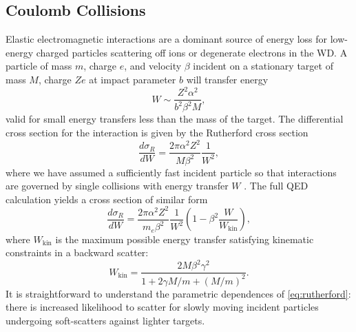 \documentclass[twocolumn,showpacs,preprintnumbers,amsmath,amssymb,prd]{revtex4}
\def\r{\right)}
\def\l{\left(}
\begin{document}
\begin{appendices}
\subsection*{Coulomb Collisions}

Elastic electromagnetic interactions are a dominant source of energy loss for low-energy charged particles scattering off ions or degenerate electrons in the WD. 
A particle of mass $m$, charge $e$, and velocity $\beta$ incident on a stationary target of mass $M$, charge $Ze$ at impact parameter $b$ will transfer energy
\begin{equation}
\label{eq:impact}
W \sim \frac{Z^2 \alpha^2}{b^2 \beta ^2 M},
\end{equation}
valid for small energy transfers less than the mass of the target. 
The differential cross section for the interaction is given by the Rutherford cross section
\begin{equation}
\label{eq:rutherford}
\frac{d \sigma_R}{dW} = \frac{2 \pi  \alpha^2 Z^2}{M \beta^2} \frac{1}{W^2},
\end{equation}
where we have assumed a sufficiently fast incident particle so that interactions are governed by single collisions with energy transfer $W$ \cite{Agashe:2014kda}.
The full QED calculation yields a cross section of similar form
\begin{equation}
\label{eq:QED}
\frac{d \sigma_R}{dW} = \frac{2 \pi  \alpha^2 Z^2}{m_e \beta^2} \frac{1}{W^2} \l1-\beta^2 \frac{W}{W_\text{kin}} \r,
\end{equation}
where $W_\text{kin}$ is the maximum possible energy transfer satisfying kinematic constraints in a backward scatter:
\begin{equation}
\label{eq:ekin}
W_{\text{kin}} = \frac{2 M \beta^2 \gamma^2}{1+ 2\gamma M/m +(M/m)^2}.
\end{equation}
It is straightforward to understand the parametric dependences of \eqref{eq:rutherford}: there is increased likelihood to scatter for slowly moving incident particles undergoing soft-scatters against lighter targets.


\end{appendices}
\end{document}
